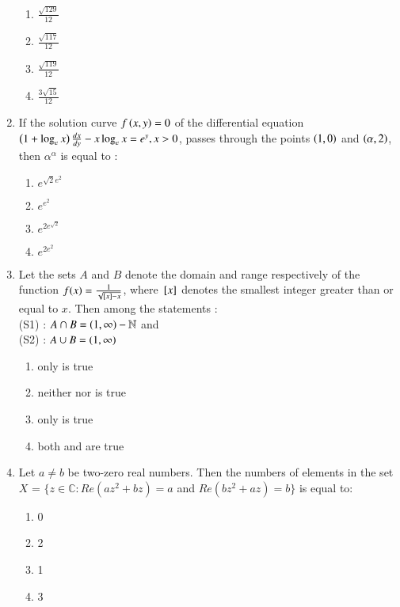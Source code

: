 \documentclass[journal,12pt,onecolumn]{IEEEtran}
\theoremstyle{remark}
\begin{document}
\begin{enumerate}
\begin{enumerate}
        \item $\frac{\sqrt{129}}{12}$ 
        \item $\frac{\sqrt{117}}{12}$
 \item $\frac{\sqrt{119}}{12}$ 
        \item $\frac{3\sqrt{15}}{12}$
\end{enumerate}
\item If the solution curve $f\left(x, y\right) = 0$ of the differential equation $\left(1+ \log_e x\right)\frac{dx}{dy} - x \log_e x =e^y, x>0$, passes through the points $\left(1, 0\right)$ and $\left(\alpha,2\right)$, then $\alpha ^{\alpha}$ is equal to :
        \begin{enumerate}
                \item $e^{\sqrt{2}e^2}$
                \item $e^{e^2}$
                \item $e^{2e^{\sqrt{2}}}$ 
        \item $e^{2e^2}$    
\end{enumerate}
\item Let the sets $A$ and $B$ denote the domain and range respectively of the function $f(x)=\frac{1}{\sqrt{{}\left[x\right]-x}}$, where ${}\left[x\right]$ denotes the smallest integer greater than or equal to $x$. Then among the statements :\\
	(S1) : $A \cap B = \left(1,\infty\right) - \mathbb{N}$ and \\
(S2) : $A \cup B = \left(1,\infty\right)$
 \begin{enumerate}
	 \item only  is true
	 \item neither  nor  is true
	 \item only  is true
	 \item both  and  are true
\end{enumerate}
\item Let $a \neq b$ be two-zero real numbers. Then the numbers of elements in the set \\ $X$ = $\{$$z \in \mathbb{C}:Re(az^2+bz)=a$  and $Re(bz^2+az)=b$$\}$ is equal to:
\begin{enumerate}
                \item 0
                \item 2
                \item 1
                \item 3
\end{enumerate}
 \end{enumerate}
\end{document}
